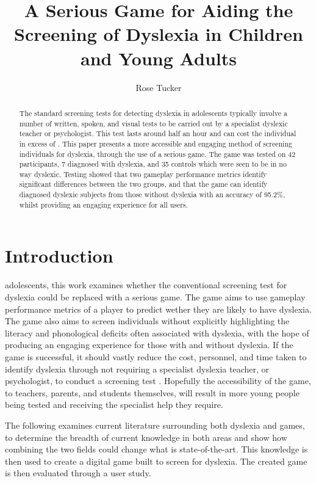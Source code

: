 \documentclass[journal]{IEEEtran}
\begin{document}
\title{\textbf{A Serious Game for Aiding the Screening of Dyslexia in Children and Young Adults}}
\author{Rose Tucker}

\maketitle

\begin{abstract}

The standard screening tests for detecting dyslexia in adolescents typically involve a number of written, spoken, and visual tests to be carried out by a specialist dyslexic teacher or psychologist.
This test lasts around half an hour and can cost the individual in excess of . 
This paper presents a more accessible and engaging method of screening individuals
 for dyslexia, through the use of a serious game. 
The game was tested on 42 participants, 7 diagnosed with dyslexia, and 35 controls which were seen to be in no way dyslexic. 
Testing showed that two gameplay performance metrics identify significant differences between the two groups, and that the game can identify diagnosed dyslexic subjects from those without dyslexia with an accuracy of 95.2\%, whilst providing an engaging experience for all users.
\end{abstract}

\section{Introduction}
\label{sec:intro}

 adolescents, this work examines whether the conventional screening
test for dyslexia could be replaced with a serious game. The game aims to use gameplay performance metrics of a player to predict wether they are likely to have dyslexia. The game also aims to screen individuals without explicitly highlighting the literacy and phonological deficits often associated with dyslexia, with the hope of 
producing an engaging experience for those with and without dyslexia. 
If the game is successful, it should vastly reduce the cost, personnel, and time taken to 
identify dyslexia through not requiring a specialist dyslexia teacher, or psychologist, to 
conduct a screening test \cite{bda, dast}. Hopefully the accessibility of the game, to 
teachers, parents, and students themselves, will result in more
young people being tested and receiving the specialist help they require.

The following examines current literature surrounding both dyslexia and games, to determine the breadth of current knowledge in both areas and show how combining the two fields could change what is state-of-the-art. This knowledge is then used to create a digital game built to screen for dyslexia. The created game is then evaluated through a user study.
\end{document}
